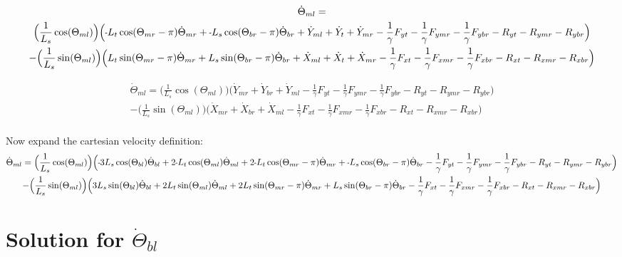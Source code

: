 \documentclass[11pt, landscape]{article}
\newcommand{\mn}{\scalebox{0.7}[1.0]{-}}
\begin{document}
\begin{multline}
\dot{\Theta}_{ml} = \\
\Big(\frac{1}{L_s}\cos(\Theta_{ml})\Big) \Big( \mn L_{t}\cos(\Theta_{mr}-\pi)\dot{\Theta}_{mr} + \mn L_{s}\cos(\Theta_{br}-\pi)\dot{\Theta}_{br}
 + \dot{Y}_{ml} + \dot{Y}_{t } + \dot{Y}_{mr} - \frac{1}{\gamma}F_{yt } - \frac{1}{\gamma}F_{ymr} - \frac{1}{\gamma}F_{ybr} - R_{yt} - R_{ymr} - R_{ybr} \Big) \\
- \Big(\frac{1}{L_s}\sin(\Theta_{ml})\Big)\Big(L_{t}\sin(\Theta_{mr}-\pi)  \dot{\Theta}_{mr} + L_{s}\sin(\Theta_{br}-\pi)\dot{\Theta}_{br}
+ \dot{X}_{ml} + \dot{X}_{t } + \dot{X}_{mr} - \frac{1}{\gamma}F_{xt } - \frac{1}{\gamma}F_{xmr} - \frac{1}{\gamma}F_{xbr} - R_{xt } - R_{xmr} - R_{xbr} \Big)
\end{multline}

\begin{multline}
\dot{\Theta}_{ml} =
\Big(\frac{1}{L_s}\cos(\Theta_{ml})\Big) \Big(\dot{Y}_{mr} + \dot{Y}_{br} + \dot{Y}_{ml}
- \frac{1}{\gamma}F_{yt } - \frac{1}{\gamma}F_{ymr} - \frac{1}{\gamma}F_{ybr} - R_{yt} - R_{ymr} - R_{ybr} \Big) \\
- \Big(\frac{1}{L_s}\sin(\Theta_{ml})\Big)\Big(\dot{X}_{mr} + \dot{X}_{br} + \dot{X}_{ml}
- \frac{1}{\gamma}F_{xt } - \frac{1}{\gamma}F_{xmr} - \frac{1}{\gamma}F_{xbr} - R_{xt } - R_{xmr} - R_{xbr} \Big)
\end{multline}
\\
Now expand the cartesian velocity definition: \\

\begin{multline}
\dot{\Theta}_{ml} =
\Big(\frac{1}{L_s}\cos(\Theta_{ml})\Big) \Big(\mn3L_{s}\cos(\Theta_{bl})\dot{\Theta}_{bl} + 2\mn L_{t}\cos(\Theta_{ml})\dot{\Theta}_{ml} + 2\mn L_{t}\cos(\Theta_{mr}-\pi)\dot{\Theta}_{mr} + \mn L_{s}\cos(\Theta_{br}-\pi)\dot{\Theta}_{br}
- \frac{1}{\gamma}F_{yt } - \frac{1}{\gamma}F_{ymr} - \frac{1}{\gamma}F_{ybr} - R_{yt} - R_{ymr} - R_{ybr} \Big) \\
- \Big(\frac{1}{L_s}\sin(\Theta_{ml})\Big)\Big(3L_{s}\sin(\Theta_{bl})\dot{\Theta}_{bl} + 2L_{t}\sin(\Theta_{ml})\dot{\Theta}_{ml} + 2L_{t}\sin(\Theta_{mr}-\pi)\dot{\Theta}_{mr} + L_{s}\sin(\Theta_{br}-\pi)\dot{\Theta}_{br}
- \frac{1}{\gamma}F_{xt } - \frac{1}{\gamma}F_{xmr} - \frac{1}{\gamma}F_{xbr} - R_{xt } - R_{xmr} - R_{xbr} \Big)
\end{multline}


\section{Solution for $\dot{\Theta}_{bl}$}
\end{document}
